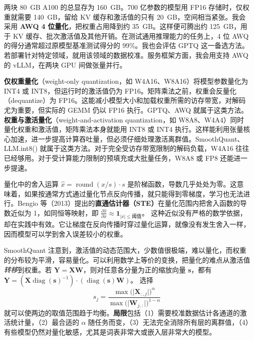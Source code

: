 \begin{interview}
两块 80~GB A100 的总显存为 160~GB。700 亿参数的模型用 FP16 存储时，仅权重就需要 140~GB，留给 KV 缓存和激活值的只有 20~GB，空间相当紧张。我会采用 \textbf{AWQ 4 位量化}，把权重占用降到约 35~GB。这样便可腾出约 125~GB，用于 KV 缓存、批次激活值及其他开销。在测试通用推理能力的任务上，4 位 AWQ 的得分通常超过原模型基准测试得分的 99\%。我也会评估 GPTQ 这一备选方法。若部署针对特定领域，就用该领域的数据校准。服务框架方面，我会用支持 AWQ 的 vLLM，在两块 GPU 间做张量并行。

\textbf{仅权重量化}（weight-only quantization，如 W4A16、W8A16）将模型参数量化为 INT4 或 INT8，但运行时的激活值仍为 FP16。矩阵乘法之前，权重会反量化（dequantize）为 FP16。这能减小模型大小和加载权重所需的访存带宽，对解码尤为重要，但实际的 GEMM 仍以 FP16 执行。GPTQ、AWQ 就属于这类方法。\textbf{权重与激活量化}（weight-and-activation quantization，如 W8A8、W4A4）同时量化权重和激活值，矩阵乘法本身就能用 INT8 或 INT4 执行。这样能利用张量核心加速，进一步提高计算吞吐量，但必须仔细处理激活离群值。SmoothQuant、LLM.int8() 就属于这类方法。对于完全受访存带宽限制的解码负载，W4A16 往往已经够用。对于受计算能力限制的预填充或大批量任务，W8A8 或 FP8 还能进一步提速。

量化中的舍入运算 $\hat{x}=\operatorname{round}(x/s)\cdot s$ 是阶梯函数，导数几乎处处为零。这意味着，如果按通常方式通过量化节点反向传播，就只能得到零梯度，学习也无法进行。Bengio 等（2013）提出的\textbf{直通估计器（STE）}在量化范围内把舍入函数的导数近似为 1，如同恒等映射，即
$\frac{\partial\hat{x}}{\partial x}\approx\mathbf{1}_{|x|\leq\text{阈值}}$。
这种近似没有严格的数学依据，却在实践中有效。它让梯度在反向传播时穿过量化运算，就像没有发生舍入一样，因而模型可以学到舍入误差较小的权重。

SmoothQuant 注意到，激活值的动态范围大，少数值很极端，难以量化，而权重的分布较为平滑，容易量化。可以利用数学上等价的变换，把量化的难点从激活值\emph{转移}到权重。若 $\mathbf{Y}=\mathbf{X}\mathbf{W}$，则对任意各分量为正的缩放向量 $\mathbf{s}$，都有
$\mathbf{Y}=(\mathbf{X}\operatorname{diag}(\mathbf{s})^{-1})\cdot(\operatorname{diag}(\mathbf{s})\mathbf{W})$。
选择
\[
s_j=\frac{\max\bigl(\lvert\mathbf{X}_{:,j}\rvert\bigr)^\alpha}
         {\max\bigl(\lvert\mathbf{W}_{j,:}\rvert\bigr)^{1-\alpha}}
\]
就可以使两边的取值范围趋于均衡。\textbf{局限}包括（1）需要校准数据估计各通道的激活统计量，（2）最合适的 $\alpha$ 随任务而变，（3）无法完全消除所有层的离群值，（4）有些模型仍然对量化敏感，尤其是词表非常大或嵌入层非常大的模型。


\end{interview}
